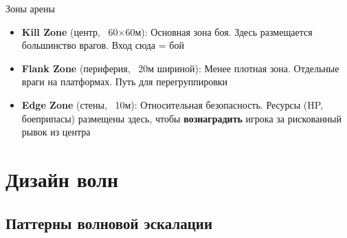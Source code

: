 \documentclass[a4paper,11pt]{report}
\begin{document}
\begin{rulebox}{Зоны арены}
\begin{itemize}[leftmargin=*]
  \item \textbf{Kill Zone} (центр, ~60$\times$60м): Основная зона боя.
    Здесь размещается большинство врагов. Вход сюда = бой
  \item \textbf{Flank Zone} (периферия, ~20м шириной): Менее
    плотная зона. Отдельные враги на платформах. Путь для
    перегруппировки
  \item \textbf{Edge Zone} (стены, ~10м): Относительная безопасность.
    Ресурсы (HP, боеприпасы) размещены здесь, чтобы \textbf{вознаградить}
    игрока за рискованный рывок из центра
\end{itemize}
\end{rulebox}

\section{Дизайн волн}

\subsection{Паттерны волновой эскалации}
\end{document}
